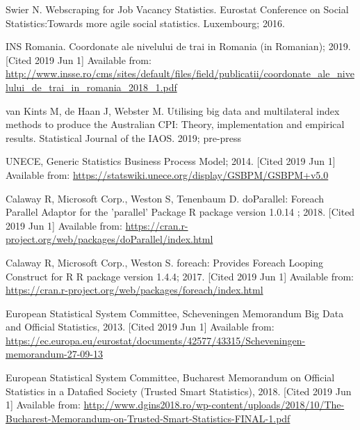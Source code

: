 \documentclass[]{article}
\begin{document}
\begin{thebibliography}{99}
Swier N. Webscraping for Job Vacancy Statistics. Eurostat Conference on Social Statistics:Towards more agile social statistics. Luxembourg; 2016.

INS Romania. Coordonate ale nivelului de trai in Romania (in Romanian); 2019. [Cited 2019 Jun 1] Available from:
\url{http://www.insse.ro/cms/sites/default/files/field/publicatii/coordonate_ale_nivelului_de_trai_in_romania_2018_1.pdf}

van Kints M, de Haan J, Webster M. Utilising big data and multilateral index methods to produce the Australian CPI: Theory, implementation and empirical results. Statistical Journal of the IAOS. 2019; pre-press

UNECE, Generic Statistics Business Process Model; 2014. [Cited 2019 Jun 1] Available from:
\url{https://statswiki.unece.org/display/GSBPM/GSBPM+v5.0}

Calaway R, Microsoft Corp., Weston S, Tenenbaum D. doParallel: Foreach Parallel Adaptor for the 'parallel' Package {R package version 1.0.14} ; 2018. [Cited 2019 Jun 1] Available from: \url{https://cran.r-project.org/web/packages/doParallel/index.html}

Calaway R, Microsoft Corp., Weston S. foreach: Provides Foreach Looping Construct for R {R package version 1.4.4}; 2017. [Cited 2019 Jun 1]
Available from: \url{https://cran.r-project.org/web/packages/foreach/index.html}  

European Statistical System Committee, Scheveningen Memorandum Big Data and Official Statistics, 2013. [Cited 2019 Jun 1]
Available from: \url{https://ec.europa.eu/eurostat/documents/42577/43315/Scheveningen-memorandum-27-09-13}

European Statistical System Committee,  Bucharest Memorandum on Official Statistics in a Datafied Society (Trusted Smart Statistics), 2018. [Cited 2019 Jun 1]
Available from: \url{http://www.dgins2018.ro/wp-content/uploads/2018/10/The-Bucharest-Memorandum-on-Trusted-Smart-Statistics-FINAL-1.pdf}

\end{thebibliography}
\end{document}
